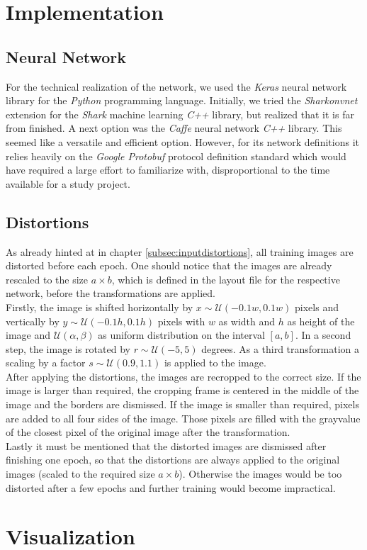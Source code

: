 \documentclass[11pt, a4paper]{article}
\newcommand\closedInt[2]{\left[#1,#2\right]}
\begin{document}
\begin{appendix}
	\section{Implementation}
	
	\subsection{Neural Network}
	For the technical realization of the network, we used the \emph{Keras} neural network library for the \emph{Python} programming language. Initially, we tried the \emph{Sharkonvnet} extension for the \emph{Shark} machine learning \emph{C++} library, but realized that it is far from finished. A next option was the \emph{Caffe} neural network \emph{C++} library. This seemed like a versatile and efficient option. However, for its network definitions it relies heavily on the \emph{Google Protobuf} protocol definition standard which would have required a large effort to familiarize with, disproportional to the time available for a study project.
	
	\subsection{Distortions}
	\label{sec:implementation-distortions}
	As already hinted at in chapter \ref{subsec:inputdistortions}, all training images are distorted before each epoch.
	One should notice that the images are already rescaled to the size $a \times b$, which is defined in the layout file for the respective network, before the transformations are applied.\\
	Firstly, the image is shifted horizontally by $x \sim \mathcal{U}(- 0.1 w, 0.1 w)$ pixels and vertically by $y \sim \mathcal{U}(- 0.1 h, 0.1 h)$ pixels with $w$ as width and $h$ as height of the image and $\mathcal{U}(\alpha,\beta)$ as uniform distribution on the interval $\closedInt{a}{b}$. In a second step, the image is rotated by $r \sim \mathcal{U}(-5, 5)$ degrees. As a third transformation a scaling by a factor $s \sim \mathcal{U}(0.9,1.1)$ is applied to the image.\\
	After applying the distortions, the images are recropped to the correct size. If the image is larger than required, the cropping frame is centered in the middle of the image and the borders are dismissed. If the image is smaller than required, pixels are added to all four sides of the image. Those pixels are filled with the grayvalue of the closest pixel of the original image after the transformation.\\
	Lastly it must be mentioned that the distorted images are dismissed after finishing one epoch, so that the distortions are always applied to the original images (scaled to the required size $a \times b$). Otherwise the images would be too distorted after a few epochs and further training would become impractical.
	
	\section{Visualization}
\end{appendix}

{}

\end{document}
